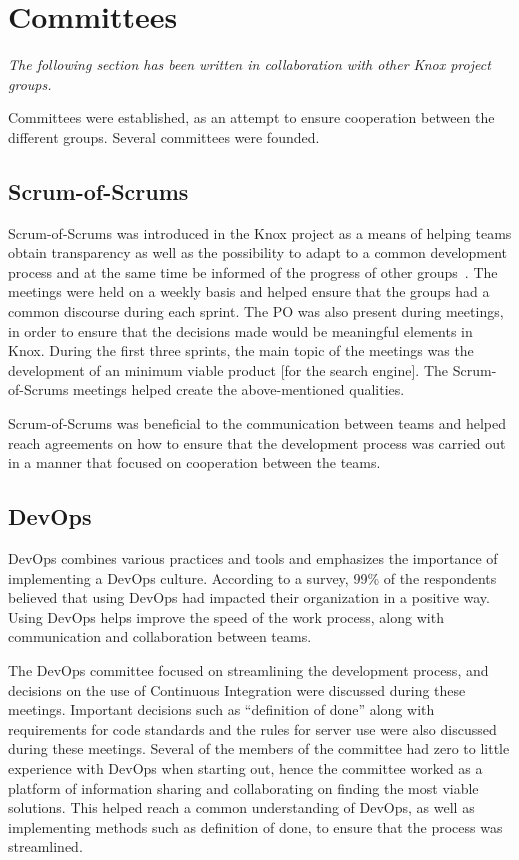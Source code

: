 \section{Committees}\label{SHARED-committees}
\textit{The following section has been written in collaboration with other Knox project groups.}

Committees were established, as an attempt to ensure cooperation between the different groups. Several committees were founded.

\subsection{Scrum-of-Scrums}
Scrum-of-Scrums was introduced in the Knox project as a means of helping teams obtain transparency as well as the possibility to adapt to a common development process and at the same time be informed of the progress of other groups\ \cite{agile}.
The meetings were held on a weekly basis and helped ensure that the groups had a common discourse during each sprint. 
The PO was also present during meetings, in order to ensure that the decisions made would be meaningful elements in Knox. 
During the first three sprints, the main topic of the meetings was the development of an minimum viable product [for the search engine].
The Scrum-of-Scrums meetings helped create the above-mentioned qualities.

Scrum-of-Scrums was beneficial to the communication between teams and helped reach agreements on how to ensure that the development process was carried out in a manner that focused on cooperation between the teams.

\subsection{DevOps}
DevOps combines various practices and tools and emphasizes the importance of implementing a DevOps culture. According to a survey, 99\% of the respondents believed that using DevOps had impacted their organization in a positive way\cite{Atlassian}. Using DevOps helps improve the speed of the work process, along with communication and collaboration between teams.

The DevOps committee focused on streamlining the development process, and decisions on the use of Continuous Integration were discussed during these meetings. 
Important decisions such as “definition of done” along with requirements for code standards and the rules for server use were also discussed during these meetings.
Several of the members of the committee had zero to little experience with DevOps when starting out, hence the committee worked as a platform of information sharing and collaborating on finding the most viable solutions. This helped reach a common understanding of DevOps, as well as implementing methods such as definition of done, to ensure that the process was streamlined.

